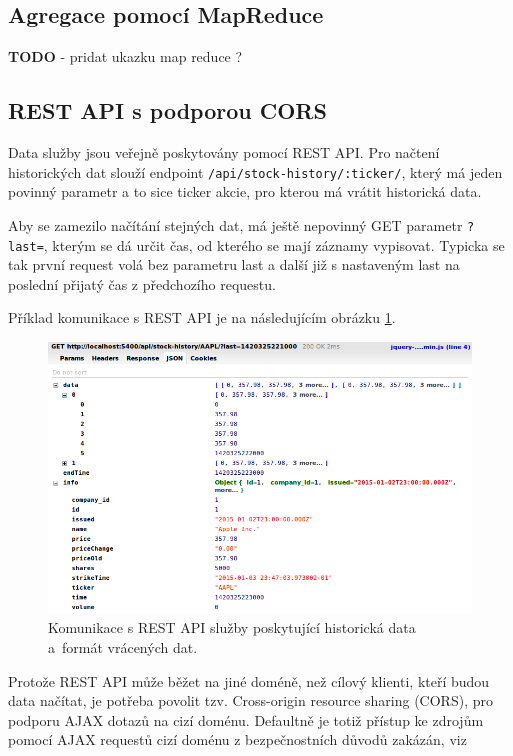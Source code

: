 \documentclass[thesis=M,czech]{FITthesis}[2012/06/26]
\begin{document}
		
\subsection{Agregace pomocí MapReduce}
	
	\textbf{TODO} - pridat ukazku map reduce ? 

\subsection{REST API s podporou CORS}
	
	Data služby jsou veřejně poskytovány pomocí REST API. Pro načtení historických dat slouží endpoint \texttt{/api/stock-history/:ticker/}, který má jeden povinný parametr a to sice ticker akcie, pro kterou má vrátit historická data.
	
	Aby se zamezilo načítání stejných dat, má ještě nepovinný GET parametr \texttt{?last=}, kterým se dá určit čas, od kterého se mají záznamy vypisovat. Typicka se tak první request volá bez parametru last a další již s nastaveným last na poslední přijatý čas z předchozího requestu.
	
	Příklad komunikace s REST API je na následujícím obrázku 	\ref{fig:hist_service_log}.

\begin{figure}[h]
	\centering
	\includegraphics[width=1\textwidth]{images/chart_service_request}
 	\caption[Komunikace s REST API služby poskytující historická data]{Komunikace s REST API služby poskytující historická data a~formát vrácených dat.}
 	\label{fig:hist_service_log} 	
\end{figure}
	
	Protože REST API může běžet na jiné doméně, než cílový klienti, kteří budou data načítat, je potřeba povolit tzv. Cross-origin resource sharing (CORS), pro podporu AJAX dotazů na cizí doménu. Defaultně je totiž přístup ke zdrojům pomocí AJAX requestů cizí doménu z bezpečnostních důvodů zakázán, viz \cite{RFCwoc}
	
\end{document}
